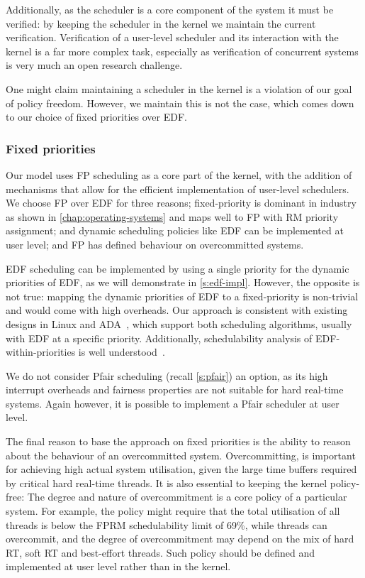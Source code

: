Additionally, as the scheduler is a core component of the system it must be
verified: by keeping the
scheduler in the kernel we maintain the current verification. Verification of a user-level scheduler
and its interaction with the kernel is a far more complex task, especially as verification of
concurrent systems is very much an open research challenge. 

One might claim maintaining a scheduler in the kernel is a violation of our goal of policy freedom.
However, we maintain this is not the case, which comes down to our choice of fixed priorities over
\gls{EDF}.

\subsubsection{Fixed priorities}

Our model uses \gls{FP} scheduling as a core part of the kernel, with the addition of mechanisms
that allow for the efficient implementation of user-level schedulers.
We choose \gls{FP} over \gls{EDF} for three reasons; 
fixed-priority is dominant in industry
as shown in \cref{chap:operating-systems} and maps well to \gls{FP} with \gls{RM} priority assignment; and dynamic scheduling policies like
\gls{EDF} can be implemented at user level; and \gls{FP} has defined behaviour on overcommitted
systems.

\gls{EDF} scheduling can be implemented by using a single priority for the dynamic
priorities of \gls{EDF}, as we will demonstrate in \cref{s:edf-impl}.
However, the opposite is not true: mapping the dynamic priorities of EDF to a fixed-priority
is non-trivial and would come with high overheads. 
Our approach is consistent with existing designs in Linux  and ADA~\citep{Burns_Wellings:crtpa}, which
support both scheduling algorithms, usually with \gls{EDF} at a specific priority. Additionally,
schedulability analysis of \gls{EDF}-within-priorities is well
understood~\citep{Harbour_Palencia_03}.

We do not consider Pfair scheduling (recall \cref{s:pfair}) an option, as its high interrupt
overheads and fairness properties are not suitable for hard real-time systems.  Again however, it is
possible to implement a Pfair scheduler at user level.

The final reason to base the approach on fixed priorities is the ability
to reason about the behaviour of an
overcommitted system. Overcommitting, is important for achieving high
actual system utilisation, given the large time buffers required by
critical hard real-time threads. It is also essential to keeping the kernel
policy-free: The degree and nature of overcommitment is a core policy
of a particular system. For example, the policy might require that the
total utilisation of all  threads is below the \gls{FPRM}
schedulability limit of 69\%, while  threads can overcommit,
and the degree of overcommitment may depend on the mix of hard RT,
soft RT and best-effort threads. Such policy should be defined and
implemented at user level rather than in the kernel.

